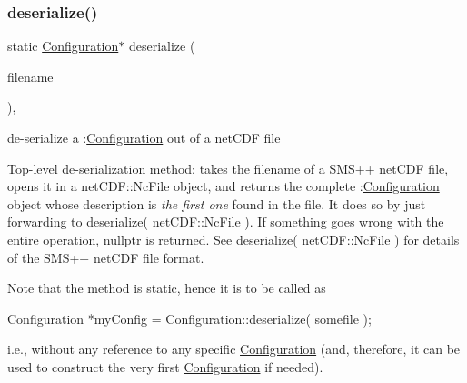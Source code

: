 \mbox{\label{class_s_m_spp__di__unipi__it_1_1_configuration_a80f801b1a2fd7ab7648faaa9004f06c9}} 
\subsubsection{\texorpdfstring{deserialize()}{deserialize()}\hspace{0.1cm}{\footnotesize\ttfamily [1/3]}}
{\footnotesize\ttfamily static \mbox{\hyperlink{class_s_m_spp__di__unipi__it_1_1_configuration}{Configuration}}$\ast$ deserialize (\begin{DoxyParamCaption}\item[{const char $\ast$}]{filename }\end{DoxyParamCaption})\hspace{0.3cm}{\ttfamily [inline]}, {\ttfamily [static]}}



de-\/serialize a \+:\mbox{\hyperlink{class_s_m_spp__di__unipi__it_1_1_configuration}{Configuration}} out of a net\+C\+DF file 

Top-\/level de-\/serialization method\+: takes the filename of a S\+M\+S++ net\+C\+DF file, opens it in a net\+C\+D\+F\+::\+Nc\+File object, and returns the complete \+:\mbox{\hyperlink{class_s_m_spp__di__unipi__it_1_1_configuration}{Configuration}} object whose description is {\itshape the first one} found in the file. It does so by just forwarding to deserialize( net\+C\+D\+F\+::\+Nc\+File ). If something goes wrong with the entire operation, nullptr is returned. See deserialize( net\+C\+D\+F\+::\+Nc\+File ) for details of the S\+M\+S++ net\+C\+DF file format.

Note that the method is static, hence it is to be called as \begin{DoxyVerb}  Configuration *myConfig = Configuration::deserialize( somefile );
\end{DoxyVerb}


i.\+e., without any reference to any specific \mbox{\hyperlink{class_s_m_spp__di__unipi__it_1_1_configuration}{Configuration}} (and, therefore, it can be used to construct the very first \mbox{\hyperlink{class_s_m_spp__di__unipi__it_1_1_configuration}{Configuration}} if needed). \mbox{\label{class_s_m_spp__di__unipi__it_1_1_configuration_aa50ffc4fbed5f8c1889daffea9fce821}} 
